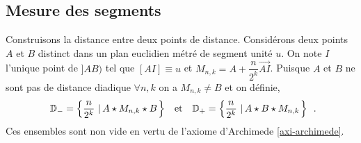         \subsection{Mesure des segments}

Construisons la distance entre deux points de distance. Considérons deux points $A$ et $B$ distinct dans un plan euclidien métré de segment unité $u$. On note $I$ l'unique point de $]AB)$ tel que $[AI]\equiv u$ et $M_{n,k}= A + \dfrac{n}{2^k}\overrightarrow{AI}$. Puisque $A$ et $B$ ne sont pas de distance diadique $\forall n,k$ on a $M_{n,k}\neq B$ et on définie,
\begin{equation*}
\begin{array}{ccc}
     \mathbb{D}_- = \left\{\dfrac{n}{2^k}\,\left|\,A\star M_{n,k} \star B\right.\right\} &\text{et}& \mathbb{D}_+ = \left\{\dfrac{n}{2^k}\,\left|\,A \star B\star M_{n,k} \right.\right\} 
\end{array}\,.
\end{equation*}
Ces ensembles sont non vide en vertu de l'axiome d'Archimede \ref{axi-archimede}. 

